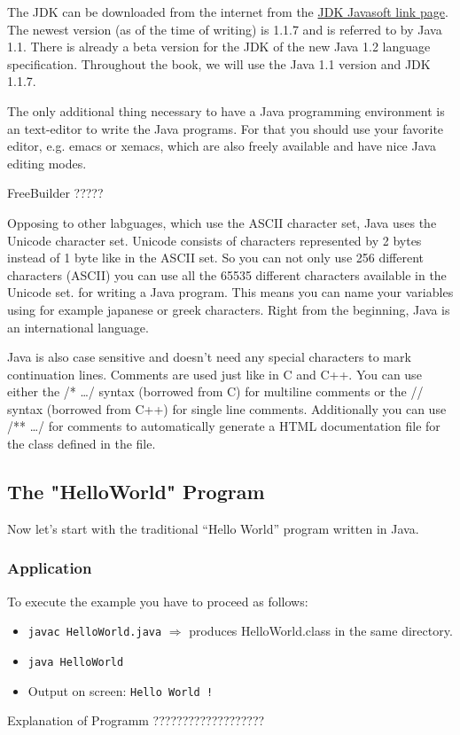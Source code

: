 The JDK can be downloaded from the internet from the 
\href{http://www.javasoft.com}{JDK Javasoft link page}.
The newest version (as of the time of writing) is 1.1.7 and is
referred to by Java 1.1. There is already a beta version for the JDK
of the new Java 1.2 language specification. Throughout the book,
we will use the Java 1.1 version and JDK 1.1.7.

The only additional thing necessary to have a Java programming
environment is an text-editor to write the Java programs. For that
you should use your favorite editor, e.g. emacs or xemacs, which are
also freely available and have nice Java editing modes.

FreeBuilder ?????

Opposing to other labguages, which use the ASCII character set, Java
uses the Unicode character set. Unicode consists of characters represented
by 2 bytes instead of 1 byte like in the ASCII set. So you can not only
use 256 different characters (ASCII) you can use all the 65535 different
characters available in the Unicode set. for writing a Java program.
This means you can name your variables using for example japanese or greek
characters. Right from the beginning, Java is an international language.

Java is also case sensitive and doesn't need any special characters
to mark continuation lines. Comments are used just like in C and C++.
You can use either the /* \ldots */ syntax (borrowed from C) for
multiline comments or the // syntax (borrowed from C++) for single
line comments. Additionally you can use /** \ldots */ for comments
to automatically generate a HTML documentation file for the class
defined in the file.
 
\subsection{The "HelloWorld" Program}
\label{sec:HelloWorld}
Now let's start with the traditional ``Hello World'' program written
in Java.

\subsubsection{Application}

To execute the example you have to proceed as follows:
\begin{itemize}
\item {}
        \verb/javac HelloWorld.java/  $\Longrightarrow$ produces
        HelloWorld.class in the same directory.
\item {}
        \verb/java HelloWorld/
\item Output on screen: \verb<Hello World !<
\end{itemize}
Explanation of Programm ???????????????????

